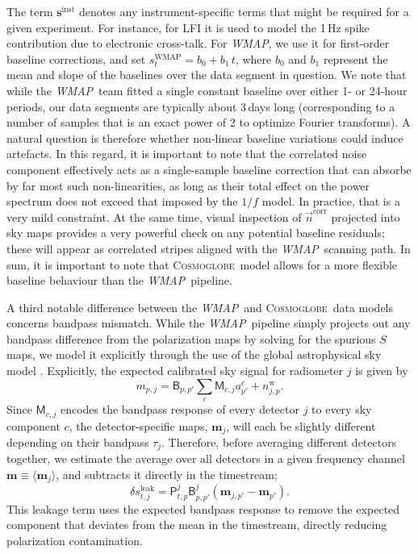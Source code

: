 \documentclass[twocolumn]{../../common/aa}
\def\WMAP{\emph{WMAP}}
\newcommand{\n}[0]{\vec{n}}
\newcommand{\cosmoglobe}{\textsc{Cosmoglobe}}
\begin{document}
The term $\boldsymbol s^\mathrm{inst}$ denotes any instrument-specific terms that might be required for a given experiment. For instance, for LFI it is used to model the 1\,Hz spike contribution due to electronic cross-talk. For \WMAP, we use it for first-order baseline corrections, and set $s^\mathrm{WMAP}_t = b_0 + b_1\,t$, where $b_0$ and $b_1$ represent the mean and slope of the baselines over the data segment in question. We note that while the \WMAP\ team fitted a single constant baseline over either 1- or 24-hour periods, our data segments are typically about 3\,days long (corresponding to a number of samples that is an exact power of 2 to optimize Fourier transforms). A natural question is therefore whether non-linear baseline variations could induce artefacts. In this regard, it is important to note that the correlated noise component effectively acts as a single-sample baseline correction that can absorbe by far most such non-linearities, as long as their total effect on the power spectrum does not exceed that imposed by the $1/f$ model. In practice, that is a very mild constraint. At the same time, visual inspection of $\n^{\mathrm{corr}}$ projected into sky maps provides a very powerful check on any potential baseline residuals; these will appear as correlated stripes aligned with the \WMAP\ scanning path. In sum, it is important to note that \cosmoglobe\ model allows for a more flexible baseline behaviour than the \WMAP\ pipeline.

A third notable difference between the \WMAP\ and \cosmoglobe\ data models concerns bandpass mismatch. While the \WMAP\ pipeline simply projects out any bandpass difference from the polarization maps by solving for the spurious $S$ maps, we model it explicitly through the use of the global astrophysical sky model \citep{bp09}. Explicitly, the expected calibrated sky signal for radiometer $j$ is given by
\begin{equation}
	m_{p,j}=\mathsf B_{p,p'}\sum_c\mathsf M_{c,j}a^c_{p'}+n_{j,p}^\mathrm w.
\end{equation}
Since $\mathsf M_{c,j}$ encodes the bandpass response of every detector $j$ to every sky component $c$, the detector-specific maps, $\boldsymbol m_j$, will each be slightly different depending on their bandpass $\tau_j$. Therefore, before averaging different detectors together, we estimate the average over all detectors in a given frequency channel $\boldsymbol m\equiv \langle \boldsymbol m_j\rangle$, and subtracts it directly in the timestream;
\begin{equation}
	\delta s_{t,j}^\mathrm{leak}=\mathsf P_{t,p}^j\mathsf B_{p,p'}^j\left(\boldsymbol m_{j,p'}-\boldsymbol m_{p'}\right).
\end{equation}
This leakage term uses the expected bandpass response to remove the expected component that deviates from the mean in the timestream, directly reducing polarization contamination. 
\end{document}

